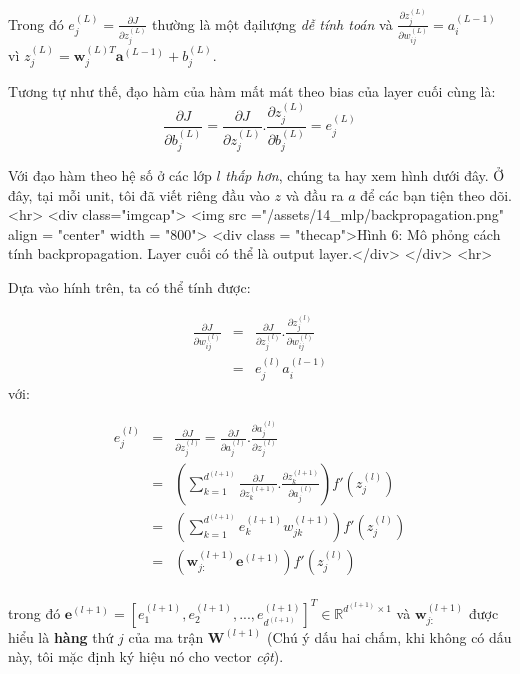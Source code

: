 Trong đó $e_j^{(L)} = \frac{\partial J}{\partial z_j^{(L)}} $ thường là một đạilượng \textit{dễ tính toán} và $\frac{\partial z_j^{(L)}}{\partial w_{ij}^{(L)}}  = a_i^{(L-1)}$ vì $z_j^{(L)} = \mathbf{w}_j^{(L)T}\mathbf{a}^{(L-1)} + b_j^{(L)}$. 
 
Tương tự như thế, đạo hàm của hàm mất mát theo bias của layer cuối cùng là: 
\begin{equation*} 
\frac{\partial J}{\partial b_{j}^{(L)}} = \frac{\partial J}{\partial z_j^{(L)}}. \frac{\partial z_j^{(L)}}{\partial b_{j}^{(L)}} = e_j^{(L)} 
\end{equation*} 
 
Với đạo hàm theo hệ số ở các lớp $l$ \textit{thấp hơn}, chúng ta hay xem hình dưới đây. Ở đây, tại mỗi unit, tôi đã viết riêng đầu vào $z$ và đầu ra $a$ để các bạn tiện theo dõi. 
<hr> 
<div class="imgcap"> 
 <img src ="/assets/14_mlp/backpropagation.png" align = "center" width = "800"> 
 <div class = "thecap">Hình 6: Mô phỏng cách tính backpropagation. Layer cuối có thể là output layer.</div> 
</div> 
<hr> 
 
Dựa vào hính trên, ta có thể tính được: 
 
\begin{equation*} 
\begin{eqnarray} 
\frac{\partial J}{\partial w_{ij}^{(l)}} &=& \frac{\partial J}{\partial z_j^{(l)}}. \frac{\partial z_j^{(l)}}{\partial w_{ij}^{(l)}} \\\ 
&=& e_j^{(l)} a_i^{(l-1)} 
\end{eqnarray} 
\end{equation*} 
với: 
 
\begin{equation*} 
\begin{eqnarray} 
e_j^{(l)} &=& \frac{\partial J}{\partial z_j^{(l)}} = \frac{\partial J}{\partial a_j^{(l)}} . \frac{\partial a_j^{(l)}}{\partial z_j^{(l)}} \\\ 
&=& \left( \sum_{k = 1}^{d^{(l+1)}} \frac{\partial J}{\partial z_k^{(l+1)}} .\frac{\partial z_k^{(l+1)}}{\partial a_j^{(l)}} \right) f'(z_j^{(l)}) \\\ 
 &=&\left( \sum_{k = 1}^{d^{(l+1)}} e_k^{(l+1)} w_{jk}^{(l+1)} \right) f'(z_j^{(l)}) \\\ 
 &=&\left( \mathbf{w}_{j:}^{(l+1)} \mathbf{e}^{(l+1)} \right) f'(z_j^{(l)}) \\\ 
\end{eqnarray} 
\end{equation*} 
 
trong đó $\mathbf{e}^{(l+1)} = [e_1^{(l+1)}, e_2^{(l+1)}, ..., e_{d^{(l+1)}}^{(l+1)}]^T \in \mathbb{R}^{d^{(l+1)}\times 1} $ và $\mathbf{w}_{j:}^{(l+1)}$ được hiểu là \textbf{hàng} thứ $j$ của ma trận $\mathbf{W}^{(l+1)}$ (Chú ý dấu hai chấm, khi không có dấu này, tôi mặc định ký hiệu nó cho vector \textit{cột}). 
 
